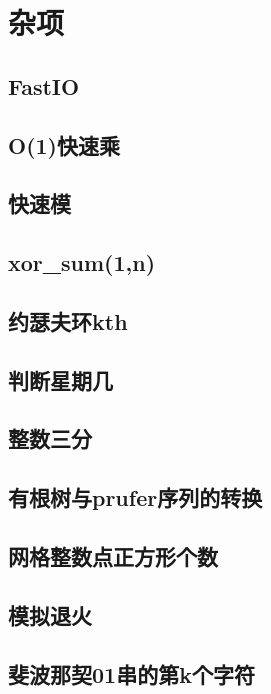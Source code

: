 \documentclass[a4paper,twocolumn]{article}
\begin{document}
\section{杂项}
\subsection{FastIO}

\subsection{O(1)快速乘}

\subsection{快速模}

\subsection{xor\_sum(1,n)}

\subsection{约瑟夫环kth}

\subsection{判断星期几}

\subsection{整数三分}

\subsection{有根树与prufer序列的转换}

\subsection{网格整数点正方形个数}

\subsection{模拟退火}

\subsection{斐波那契01串的第k个字符}

\end{document}
